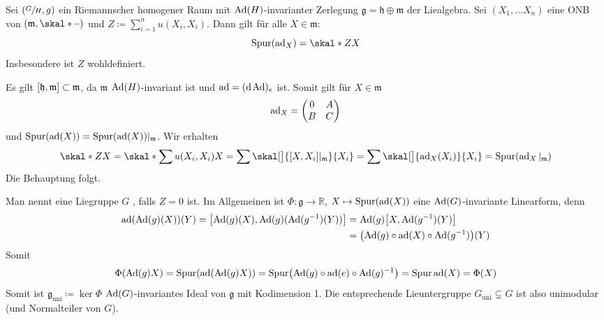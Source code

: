 \begin{lemma}
	Sei $\enbrace*{\sfrac{G}{H},g}$ ein Riemannscher homogener Raum mit $\Ad(H)$-invarianter Zerlegung $\mathfrak{g} = \mathfrak{h} \oplus \mathfrak{m}$ der Liealgebra.
	Sei $(X_1,\ldots X_n)$ eine ONB von $\enbrace*{\mathfrak{m},\skal*{\cdot }{\cdot}}$ und $Z \coloneqq \sum_{i=1}^{n} u(X_i,X_i)$.
	Dann gilt für alle $X \in \mathfrak{m}$:
	\[
		\operatorname{Spur} (\ad_X) = \skal*{Z}{X}
	\]
	Insbesondere ist $Z$ wohldefiniert.
\end{lemma}
\begin{beweis}
	Es gilt $\benbrace*{\mathfrak{h},\mathfrak{m}} \subset \mathfrak{m}$, da $\mathfrak{m}$ $\Ad(H)$-invariant ist und $\ad = (\mathd \Ad)_e$ ist.
	Somit gilt für $X \in \mathfrak{m}$
	\[
		\ad_X = \begin{pmatrix}
			0 & A \\ B & C
		\end{pmatrix}
	\]
	und $\operatorname{Spur} (\ad(X)) = \operatorname{Spur}(\ad(X))|_\mathfrak{m}$.
	Wir erhalten 
	\begin{align}
		\skal*{Z}{X} = \skal*{\sum u(X_i,X_i)}{X} = \sum \skal[\big]{\benbrace*{X,X_i}|_\mathfrak{m}}{X_i} = \sum \skal[\big]{\ad_X(X_i)}{X_i} = \operatorname{Spur}(\ad_X|_\mathfrak{m})
	\end{align}
	Die Behauptung folgt.
\end{beweis}

Man nennt eine Liegruppe $G$ , falls $Z=0$ ist.
Im Allgemeinen ist  $\Phi \colon \mathfrak{g} \to \mathbb{R}$, $X \mapsto \operatorname{Spur} (\ad(X))$  eine $\Ad(G)$-invariante Linearform, denn
\begin{align}
	\ad \enbrace*{\Ad(g)(X)}(Y) = \benbrace*{\Ad(g)(X),\Ad(g)(\Ad(g^{-1})(Y))} &= \Ad(g) \benbrace*{X, \Ad(g^{-1})(Y)} \\
	&= \enbrace*{\Ad(g) \circ \ad(X) \circ \Ad(g^{-1})}(Y)
\end{align}
Somit 
\[
	\Phi \enbrace*{\Ad(g) X} = \operatorname{Spur} \enbrace*{\ad \enbrace*{\Ad(g) X}} = \operatorname{Spur} \enbrace*{\Ad(g) \circ \ad(e) \circ \Ad(g)^{-1}} = \operatorname{Spur} \ad(X) = \Phi(X)
\]
Somit ist $\mathfrak{g}_\mathrm{uni} \coloneq \ker \Phi$ $\Ad(G)$-invariantes Ideal von $\mathfrak{g}$ mit Kodimension 1.
Die entsprechende Lieuntergruppe $G_\mathrm{uni} \subsetneq G$ ist also unimodular (und Normalteiler von $G$).

